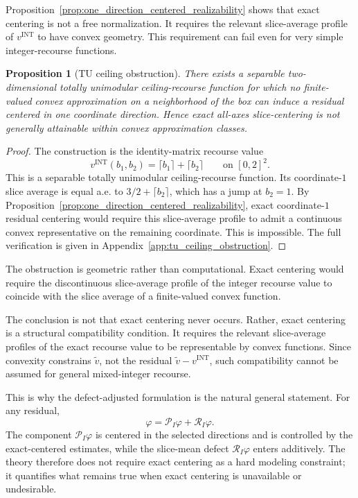 \documentclass[11pt,letterpaper]{article}
\newtheorem{proposition}[theorem]{Proposition}
\theoremstyle{definition}
\theoremstyle{remark}
\newcommand{\INT}{\mathrm{INT}}
\begin{document}
Proposition~\ref{prop:one_direction_centered_realizability} shows that exact
centering is not a free normalization. It requires the relevant slice-average
profile of $v^{\INT}$ to have convex geometry. This requirement can fail even
for very simple integer-recourse functions.

\begin{proposition}[TU ceiling obstruction]
\label{prop:2d_tu_no_exact_smz_main}
There exists a separable two-dimensional totally unimodular ceiling-recourse
function for which no finite-valued convex approximation on a neighborhood of
the box can induce a residual centered in one coordinate direction. Hence
exact all-axes slice-centering is not generally attainable within convex
approximation classes.
\end{proposition}

\begin{proof}
The construction is the identity-matrix recourse value
$$
v^{\INT}(b_1,b_2)=\lceil b_1\rceil+\lceil b_2\rceil
\qquad \text{on } [0,2]^2 .
$$
This is a separable totally unimodular ceiling-recourse function. Its
coordinate-$1$ slice average is equal a.e. to
$3/2+\lceil b_2\rceil$, which has a jump at $b_2=1$. By
Proposition~\ref{prop:one_direction_centered_realizability}, exact
coordinate-$1$ residual centering would require this slice-average profile to
admit a continuous convex representative on the remaining coordinate. This is
impossible. The full verification is given in Appendix~\ref{app:tu_ceiling_obstruction}.
\end{proof}
The obstruction is geometric rather than computational. Exact centering would
require the discontinuous slice-average profile of the integer recourse value
to coincide with the slice average of a finite-valued convex function.



The conclusion is not that exact centering never occurs. Rather, exact
centering is a structural compatibility condition. It requires the relevant
slice-average profiles of the exact recourse value to be representable by
convex functions. Since convexity constrains $\widetilde v$, not the residual
$\widetilde v-v^{\INT}$, such compatibility cannot be assumed for general
mixed-integer recourse.

This is why the defect-adjusted formulation is the natural general statement.
For any residual,
$$
\varphi=\mathcal P_I\varphi+\mathcal R_I\varphi .
$$
The component $\mathcal P_I\varphi$ is centered in the selected directions and
is controlled by the exact-centered estimates, while the slice-mean defect
$\mathcal R_I\varphi$ enters additively. The theory therefore does not require
exact centering as a hard modeling constraint; it quantifies what remains true
when exact centering is unavailable or undesirable.
\end{document}
